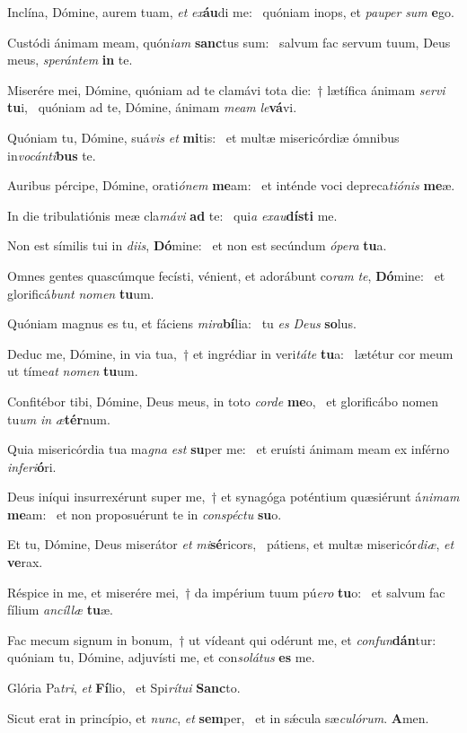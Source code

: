 \item Inclína, Dómine, aurem tuam, \textit{et} \textit{ex}\textbf{áu}di me:~\psstar{} quóniam inops, et \textit{pauper} \textit{sum} \textbf{e}go.
\item Custódi ánimam meam, quón\textit{iam} \textbf{sanc}tus sum:~\psstar{} salvum fac servum tuum, Deus meus, \textit{sperántem} \textbf{in} te.
\item Miserére mei, Dómine, quóniam ad te clamávi tota die:~† lætífica ánimam \textit{servi} \textbf{tu}i,~\psstar{} quóniam ad te, Dómine, ánimam \textit{meam} \textit{le}\textbf{vá}vi.
\item Quóniam tu, Dómine, suá\textit{vis} \textit{et} \textbf{mi}tis:~\psstar{} et multæ misericórdiæ ómnibus in\textit{vocánti}\textbf{bus} te.
\item Auribus pércipe, Dómine, orati\textit{ónem} \textbf{me}am:~\psstar{} et inténde voci depreca\textit{tiónis} \textbf{me}æ.
\item In die tribulatiónis meæ cla\textit{mávi} \textbf{ad} te:~\psstar{} qui\textit{a} \textit{exau}\textbf{dís}\textbf{ti} me.
\item Non est símilis tui in \textit{diis}, \textbf{Dó}mine:~\psstar{} et non est secúndum \textit{ópera} \textbf{tu}a.
\item Omnes gentes quascúmque fecísti, vénient, et adorábunt co\textit{ram} \textit{te}, \textbf{Dó}mine:~\psstar{} et glorificá\textit{bunt} \textit{nomen} \textbf{tu}um.
\item Quóniam magnus es tu, et fáciens \textit{mira}\textbf{bí}lia:~\psstar{} tu \textit{es} \textit{Deus} \textbf{so}lus.
\item Deduc me, Dómine, in via tua,~† et ingrédiar in veri\textit{táte} \textbf{tu}a:~\psstar{} lætétur cor meum ut tíme\textit{at} \textit{nomen} \textbf{tu}um.
\item Confitébor tibi, Dómine, Deus meus, in toto \textit{corde} \textbf{me}o,~\psstar{} et glorificábo nomen tu\textit{um} \textit{in} \textit{æ}\textbf{tér}num.
\item Quia misericórdia tua ma\textit{gna} \textit{est} \textbf{su}per me:~\psstar{} et eruísti ánimam meam ex inférno \textit{inferi}\textbf{ó}ri.
\item Deus iníqui insurrexérunt super me,~† et synagóga poténtium quæsiérunt á\textit{nimam} \textbf{me}am:~\psstar{} et non proposuérunt te in \textit{conspéctu} \textbf{su}o.
\item Et tu, Dómine, Deus miserátor \textit{et} \textit{mi}\textbf{sé}ricors,~\psstar{} pátiens, et multæ misericór\textit{diæ}, \textit{et} \textbf{ve}rax.
\item Réspice in me, et miserére mei,~† da impérium tuum pú\textit{ero} \textbf{tu}o:~\psstar{} et salvum fac fílium \textit{ancíllæ} \textbf{tu}æ.
\item Fac mecum signum in bonum,~† ut vídeant qui odérunt me, et \textit{confun}\textbf{dán}tur:~\psstar{} quóniam tu, Dómine, adjuvísti me, et con\textit{solátus} \textbf{es} me.
\item Glória Pa\textit{tri}, \textit{et} \textbf{Fí}lio,~\psstar{} et Spi\textit{rítui} \textbf{Sanc}to.
\item Sicut erat in princípio, et \textit{nunc}, \textit{et} \textbf{sem}per,~\psstar{} et in sǽcula sæ\textit{culórum}. \textbf{A}men.
